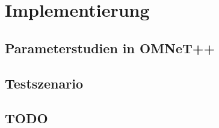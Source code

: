 \chapter{Implementierung}
\label{chapter:kap4}

\section{Parameterstudien in OMNeT++}

\section{Testszenario}

\section{TODO}